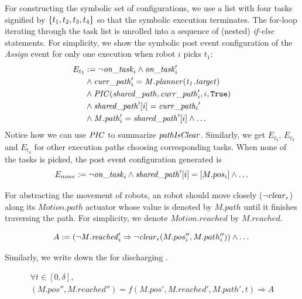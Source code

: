For constructing the symbolic set of configurations,
we use a list with four tasks signified by $\left\{t_1,t_2,t_3,t_4\right\}$ so that the symbolic execution terminates.
The for-loop iterating through the task list is unrolled into a sequence of (nested) \emph{if-else} statements.
For simplicity,
we show the symbolic post event configuration of the \emph{Assign} event for only one execution when robot $i$ picks $t_1$:
\begin{align*}
    E_{t_1} &:= \neg\mathit{on\_task}_i \land \mathit{on\_task}_i' \\
            & \land \mathit{curr\_path}_i' = \mathit{M.planner(t_1.target)} \\
            & \land \mathit{PIC}(\mathit{shared\_path}, \mathit{curr\_path}_i', i, \mathtt{True}) \\
            & \land \mathit{shared\_path}'[i] = \mathit{curr\_path_i}' \\
            & \land \mathit{M.path}_i' = \mathit{shared\_path}'[i] \land \dots
\end{align*}
Notice how we can use $\mathit{PIC}$ to summarize $\mathit{pathIsClear}$.
Similarly, we get $E_{t_2}$, $E_{t_3}$ and $E_{t_4}$ for other execution paths choosing corresponding tasks.
When none of the tasks is picked, the post event configuration generated is
\[
E_{none} :=\neg\mathit{on\_task}_i \land \mathit{shared\_path}'[i] = [M.pos_i] \land \dots
\]

For abstracting the movement of robots,
an robot should move closely ($\neg\mathit{clear}_\epsilon$) along its $\mathit{Motion.path}$ actuator whose value is denoted by $\mathit{M.path}$ until it finishes traversing the path.
For simplicity, we denote $\mathit{Motion.reached}$ by $\mathit{M.reached}$.
\begin{assumption}
    \label{stlinemotion}
\[
A := (\neg \mathit{M.reached}'_i \Rightarrow \neg\mathit{clear}_\epsilon(M.pos_i'', M.path_i'')) \land \dots
\]
\end{assumption}\noindent
Similarly, we write down the  for discharging .
\begin{proofob}
    \small
\[
\begin{array}{l}
    \forall t \in [0, \delta], \\
(M.pos'', M.reached'') = f(M.pos', M.reached', M.path', t) \Rightarrow A
\end{array}
\]
\end{proofob}

